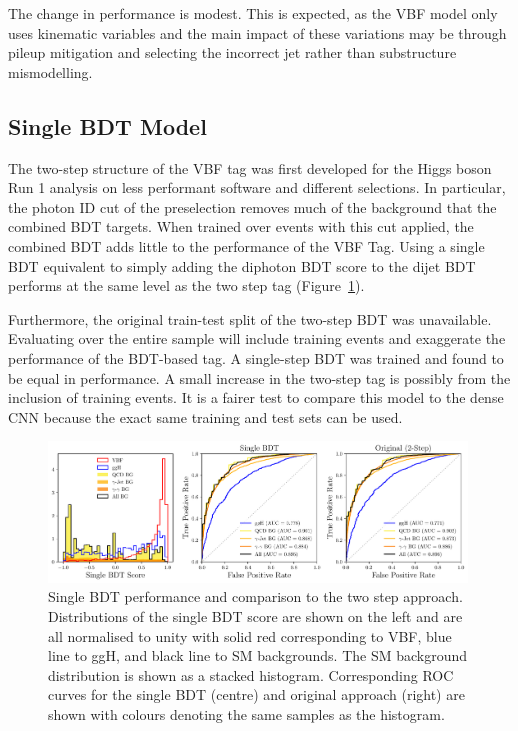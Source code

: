 The change in performance is modest. This is expected, as the VBF model only uses kinematic variables and the main impact of these variations may be through pileup mitigation and selecting the incorrect jet rather than substructure mismodelling. 


\subsection{Single BDT Model}
The two-step structure of the VBF tag was first developed for the Higgs boson Run 1 analysis  on less performant software and different selections. 
In particular, the photon ID cut of the preselection removes much of the background that the combined BDT targets. 
When trained over events with this cut applied, the combined BDT adds little to the performance of the VBF Tag. 
Using a single BDT equivalent to simply adding the diphoton BDT score to the dijet BDT performs at the same level as the two step tag (Figure~\ref{fig:event_categorisation:single_BDT}).

Furthermore, the original train-test split of the two-step BDT was unavailable. Evaluating over the entire sample will include training events and exaggerate the performance of the BDT-based tag. 
A single-step BDT was trained and found to be equal in performance. A small increase in the two-step tag is possibly from the inclusion of training events. 
It is a fairer test to compare this model to the dense CNN because the exact same training and test sets can be used. 
\begin{figure}[h!]
    \centering
    \includegraphics[width=0.99\textwidth]{figures/event_selection/dijet_BDT_PS_unw.pdf}
    \caption{Single BDT performance and comparison to the two step approach. Distributions of the single BDT score are shown on the left and are all normalised to unity with solid red corresponding to VBF, blue line to ggH, and black line to SM backgrounds. The SM background distribution is shown as a stacked histogram. Corresponding ROC curves for the single BDT (centre) and original approach (right) are shown with colours denoting the same samples as the histogram.}
    \label{fig:event_categorisation:single_BDT}
\end{figure}


















